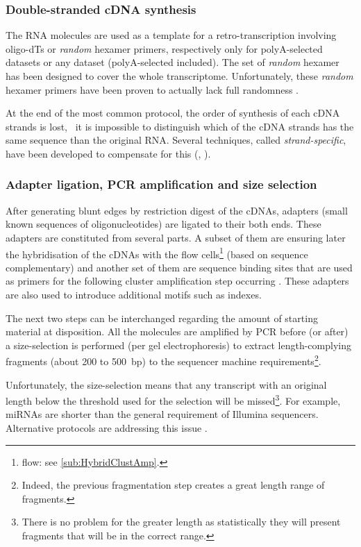 \subsubsection{Double-stranded cDNA synthesis}
The \gls{RNA} molecules are used as a template for a retro-transcription
involving oligo-dTs or \emph{random} hexamer primers, respectively only
for polyA-selected datasets or any dataset (polyA-selected included).
The set of \emph{random} hexamer has been designed to cover the whole
transcriptome. Unfortunately, these \emph{random} hexamer primers have been
proven to actually lack full randomness .

At the end of the most common protocol, the order of synthesis of each \gls{cDNA}
strands is lost, \ie\ it is impossible to distinguish which of the \gls{cDNA}
strands has the same sequence than the original \gls{RNA}. Several techniques,
called \emph{strand-specific}, have been developed to compensate for this
(, ).

\subsubsection{Adapter ligation, PCR amplification and size selection}
After generating blunt edges by restriction digest of the \glspl{cDNA}, adapters
(small known sequences of oligonucleotides) are ligated to their both ends.
These adapters are constituted from several parts. A subset of them are ensuring
later the hybridisation of the \glspl{cDNA} with the flow
cells\footnote{\Gls{flow}: see \cref{sub:HybridClustAmp}.} (based on sequence
complementary) and another set of them
are sequence binding sites that are used as primers for the following cluster
amplification step occurring . These adapters are also used to
introduce additional motifs such as indexes.

The next two steps can be interchanged regarding the amount of starting material
at disposition. All the molecules are amplified by \gls{PCR} before (or after)
a size-selection is performed (per gel electrophoresis) to extract
length-complying fragments (about 200 to 500\ bp) to the sequencer machine
requirements\footnote{Indeed, the previous fragmentation step creates a great
length range of fragments.}.

Unfortunately, the size-selection means that any
transcript with an original length below the threshold used for the
selection will be missed\footnote{There is no problem for the greater length
as statistically they will present fragments that will be in the correct range.}.
For example, \glspl{miRNA} are shorter than the general requirement of Illumina
sequencers. Alternative protocols are addressing this issue
.

